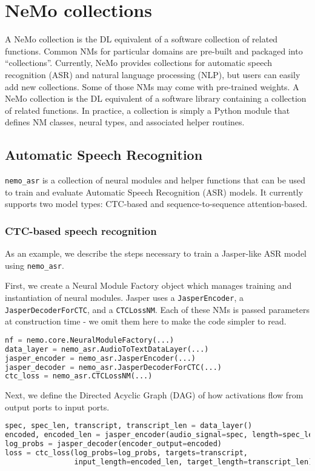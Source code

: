 \documentclass{article}
\begin{document}
\section{NeMo collections}\label{collections}
A NeMo collection is the DL equivalent of a software collection of related functions. Common NMs for particular domains are pre-built and packaged into ``collections''. Currently, NeMo provides collections for automatic speech recognition (ASR) and natural language processing (NLP), but users can easily add new collections. Some of those NMs may come with pre-trained weights.  A NeMo collection is the DL equivalent of a software library containing a collection of related functions.  In practice, a collection is simply a Python module that defines NM classes, neural types, and associated helper routines. 


\subsection{Automatic Speech Recognition}
\texttt{nemo\_asr} is a collection of neural modules and helper functions that can be used to train and evaluate Automatic Speech Recognition (ASR) models. It currently supports two model types: CTC-based and sequence-to-sequence attention-based.



\subsubsection{CTC-based speech recognition}\label{ctcexample}
As an example, we describe the steps necessary to train a Jasper-like ASR model\citep{li2019} using \texttt{nemo\_asr}.

First, we create a Neural Module Factory object which manages training and instantiation of neural modules. Jasper uses a \texttt{JasperEncoder}, a \texttt{JasperDecoderForCTC}, and a \texttt{CTCLossNM}.  Each of these NMs is passed parameters at construction time - we omit them here to make the code simpler to read.
\begin{lstlisting}[language=Python, basicstyle=\small]
nf = nemo.core.NeuralModuleFactory(...)
data_layer = nemo_asr.AudioToTextDataLayer(...)
jasper_encoder = nemo_asr.JasperEncoder(...)
jasper_decoder = nemo_asr.JasperDecoderForCTC(...)
ctc_loss = nemo_asr.CTCLossNM(...)
\end{lstlisting}

Next, we define the Directed Acyclic Graph (DAG) of how activations flow from output ports to input ports.
\begin{lstlisting}[language=Python, basicstyle=\small]
spec, spec_len, transcript, transcript_len = data_layer()
encoded, encoded_len = jasper_encoder(audio_signal=spec, length=spec_len)
log_probs = jasper_decoder(encoder_output=encoded)
loss = ctc_loss(log_probs=log_probs, targets=transcript,
                input_length=encoded_len, target_length=transcript_len)
\end{lstlisting}
\end{document}
